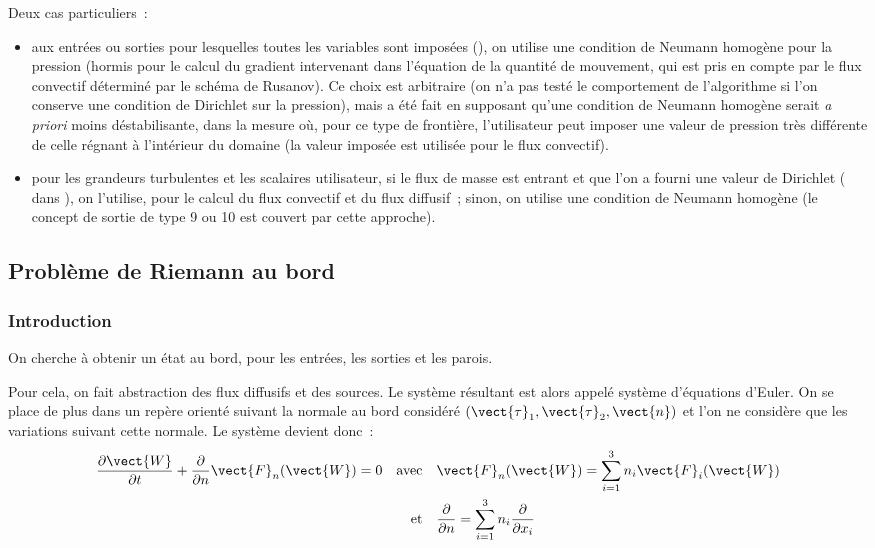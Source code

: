 Deux cas particuliers~:
\begin{itemize}
\item aux entrées ou sorties pour lesquelles toutes les variables sont imposées
(), on utilise une condition de Neumann homogène pour la pression
(hormis pour le calcul du gradient intervenant dans l'équation de la quantité
de mouvement, qui est pris en compte par le flux convectif déterminé par le
schéma de Rusanov). Ce choix est arbitraire (on n'a pas testé le comportement
de l'algorithme si l'on conserve une condition de Dirichlet sur la pression), mais
a été fait en supposant qu'une condition de Neumann homogène serait {\it a
priori} moins déstabilisante, dans la mesure où, pour ce type de frontière,
l'utilisateur peut imposer une valeur de pression très différente de
celle régnant à l'intérieur du domaine (la valeur imposée est utilisée
pour le flux convectif).
\item pour les grandeurs turbulentes et les scalaires utilisateur, si
le flux de masse est entrant et que l'on a fourni
une valeur de Dirichlet ( dans ),
on l'utilise, pour le calcul du flux convectif et du flux diffusif~;
sinon, on utilise une condition de Neumann homogène (le concept
de sortie de type 9 ou 10 est couvert par cette approche).
\end{itemize}



\subsection*{Problème de Riemann au bord}
\label{Cfbl_Cfxtcl_section_pb_riemann_cfener}

\subsubsection*{Introduction}

On cherche à obtenir un état au bord,
pour les entrées, les sorties et les parois.

Pour cela, on fait abstraction des flux diffusifs et des sources.
Le système résultant est alors appelé système
d'équations d'Euler. On se place de plus dans un
repère orienté suivant la normale au bord considéré
$(\vect{\tau}_1,\vect{\tau}_2,\vect{n})$
et l'on ne considère que les variations suivant cette normale.
Le système devient donc~:
\begin{equation}\label{Cfbl_Cfxtcl_eq_euler_cfxtcl}
\begin{aligned}
\displaystyle\frac{\partial \vect{W}}{\partial t}
+ \frac{\partial}{\partial n}\vect{F}_n(\vect{W})
&= 0
&\text{avec}
&\quad \vect{F}_n(\vect{W})
= \displaystyle\sum\limits_{i=1}^3 n_i \vect{F}_i(\vect{W})\\
&&\text{et}
&\quad \displaystyle\frac{\partial}{\partial n}
= \displaystyle\sum\limits_{i=1}^3 n_i \frac{\partial}{\partial x_i}
\end{aligned}
\end{equation}

